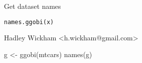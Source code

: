 \begin{Description}\relax
Get dataset names
\end{Description}
\begin{Usage}
\begin{verbatim}names.ggobi(x)\end{verbatim}
\end{Usage}
\begin{Arguments}
\begin{ldescription}
\item[\code{x}] 
\end{ldescription}
\end{Arguments}
\begin{Details}\relax
\end{Details}
\begin{Author}\relax
Hadley Wickham <h.wickham@gmail.com>
\end{Author}
\begin{Examples}
\begin{ExampleCode}g <- ggobi(mtcars)
names(g)\end{ExampleCode}
\end{Examples}

